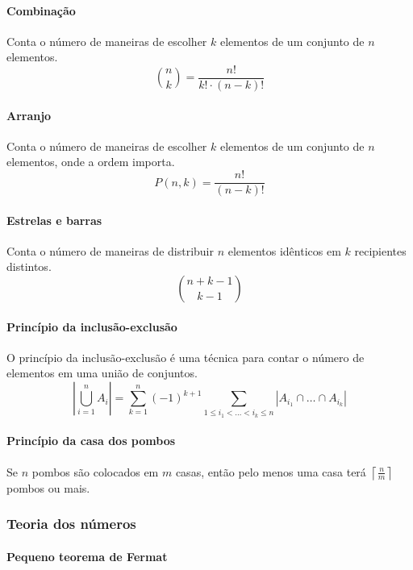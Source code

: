 \paragraph{Combinação}

Conta o número de maneiras de escolher $k$ elementos de um conjunto de $n$ elementos.
\[
\binom{n}{k} = \frac{n!}{k! \cdot (n - k)!}
\]

\paragraph{Arranjo}

Conta o número de maneiras de escolher $k$ elementos de um conjunto de $n$ elementos, onde a ordem importa.
\[
P(n, k) = \frac{n!}{(n - k)!}
\]

\paragraph{Estrelas e barras}

Conta o número de maneiras de distribuir $n$ elementos idênticos em $k$ recipientes distintos.
\[
\binom{n + k - 1}{k - 1}
\]

\paragraph{Princípio da inclusão-exclusão}

O princípio da inclusão-exclusão é uma técnica para contar o número de elementos em uma união de conjuntos.
\[
\left| \bigcup_{i=1}^n A_i \right| = \sum_{k=1}^n (-1)^{k+1} \sum_{1 \le i_1 < \dots < i_k \le n} |A_{i_1} \cap \dots \cap A_{i_k}|
\]

\paragraph{Princípio da casa dos pombos}

Se $n$ pombos são colocados em $m$ casas, então pelo menos uma casa terá $\left\lceil \frac{n}{m} \right\rceil$ pombos ou mais.

\subsubsection{Teoria dos números}

\paragraph{Pequeno teorema de Fermat}

